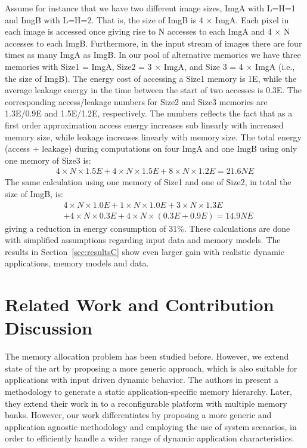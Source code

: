 Assume for instance that we have two different image sizes, ImgA with L=H=1 and ImgB with L=H=2. 
That is, the size of ImgB is 4 $\times$ ImgA. 
Each pixel in each image is accessed once giving rise to N accesses to each ImgA and 4 $\times$ N accesses to each ImgB. 
Furthermore, in the input stream of images there are four times as many ImgA as ImgB. 
In our pool of alternative memories we have three memories with Size1 = ImgA, Size2  = 3 $\times$ ImgA, and Size 3 = 4 $\times$ ImgA (i.e., the size of ImgB). 
The energy cost of accessing a Size1 memory is 1E, while the average leakage energy in the time between the start of two accesses is 0.3E. 
The corresponding access/leakage numbers for Size2 and Size3 memories are 1.3E/0.9E and 1.5E/1.2E, respectively. 
The numbers reflects the fact that as a first order approximation access energy increases sub linearly with increased memory size, while leakage increases linearly with memory size. 
The total energy (access + leakage) during computations on four ImgA and one ImgB using only one memory of Size3 is:
\begin{align*}
4 \times N \times 1.5E + 4 \times N \times 1.5E + 8 \times N \times 1.2E = 21.6NE
\end{align*}
The same calculation using one memory of Size1 and one of Size2, in total the size of ImgB, is: 
\begin{align*}
& 4 \times N \times 1.0E + 1 \times N \times 1.0E + 3 \times N \times 1.3E \\
& + 4 \times N \times 0.3E + 4 \times N \times (0.3E + 0.9E) =  14.9NE
\end{align*}
giving a reduction in energy consumption of 31\%. 
These calculations are done with simplified assumptions regarding input data and memory models. 
The results in Section~\ref{sec:resultsC} show even larger gain with realistic dynamic applications, memory models and data.

\section{Related Work and Contribution Discussion}
\label{sec:relatedC}

The memory allocation problem has been studied before. 
However, we extend state of the art by proposing a more generic approach, which is also suitable for applications with input driven dynamic behavior. 
The authors in \cite{Ben00b} present a methodology to generate a static application-specific memory hierarchy. 
Later, they extend their work in \cite{Ben00c} to a reconfigurable platform with multiple memory banks. 
However, our work differentiates by proposing a more generic and application agnostic methodology and employing the use of system scenarios, in order to efficiently handle a wider range of dynamic application characteristics. 

